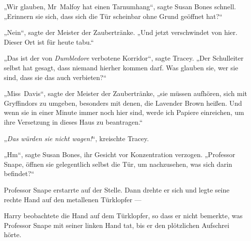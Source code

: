 „Wir glauben, Mr~Malfoy hat einen Tarnumhang“, sagte Susan Bones schnell.
„Erinnern sie sich, dass sich die Tür scheinbar ohne Grund geöffnet hat?“

„Nein“, sagte der Meister der Zaubertränke.
„Und jetzt verschwindet von hier. Dieser Ort ist für heute tabu.“

„Das ist der von \emph{Dumbledore} verbotene Korridor“, sagte Tracey.
„Der Schulleiter selbst hat gesagt, dass niemand hierher kommen darf. Was glauben sie, wer sie sind, dass sie das auch verbieten?“

„Miss~Davis“, sagte der Meister der Zaubertränke,
„sie müssen aufhören, sich mit Gryffindors zu umgeben, besonders mit denen, die Lavender Brown heißen. Und wenn sie in einer Minute immer noch hier sind, werde ich Papiere einreichen, um ihre Versetzung in dieses Haus zu beantragen.“

„\emph{Das würden sie nicht wagen!}“, kreischte Tracey.

„Hm“, sagte Susan Bones, ihr Gesicht vor Konzentration verzogen.
„Professor Snape, öffnen sie gelegentlich selbst die Tür, um nachzusehen, was sich darin befindet?“

Professor Snape erstarrte auf der Stelle. Dann drehte er sich und legte seine rechte Hand auf den metallenen Türklopfer —

Harry beobachtete die Hand auf dem Türklopfer, so dass er nicht bemerkte, was Professor Snape mit seiner linken Hand tat, bis er den plötzlichen Aufschrei hörte.

